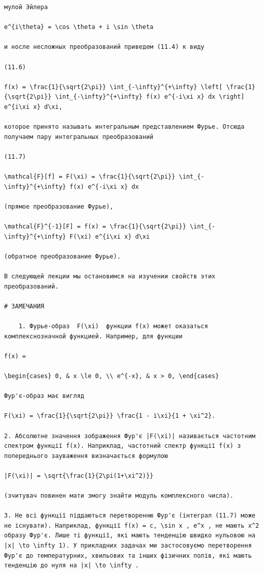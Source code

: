 \documentclass[
  ukrainian,
]{article}
\begin{document}
\begin{verbatim}
мулой Эйлера

e^{i\theta} = \cos \theta + i \sin \theta

и носле несложных преобразований приведем (11.4) к виду

(11.6)

f(x) = \frac{1}{\sqrt{2\pi}} \int_{-\infty}^{+\infty} \left[ \frac{1}{\sqrt{2\pi}} \int_{-\infty}^{+\infty} f(x) e^{-i\xi x} dx \right] e^{i\xi x} d\xi,

которое принято называть интегральным представлением Фурье. Отсюда получаем пару интегральных преобразований

(11.7)

\mathcal{F}[f] = F(\xi) = \frac{1}{\sqrt{2\pi}} \int_{-\infty}^{+\infty} f(x) e^{-i\xi x} dx

(прямое преобразование Фурье),

\mathcal{F}^{-1}[F] = f(x) = \frac{1}{\sqrt{2\pi}} \int_{-\infty}^{+\infty} F(\xi) e^{i\xi x} d\xi

(обратное преобразование Фурье).

В следующей лекции мы остановимся на изучении свойств этих преобразований.

# ЗАМЕЧАНИЯ

    1. Фурье-образ  F(\xi)  функции f(x) может оказаться комплекснозначной функцией. Например, для функции

f(x) =

\begin{cases} 0, & x \le 0, \\ e^{-x}, & x > 0, \end{cases}

Фур'є-образ має вигляд

F(\xi) = \frac{1}{\sqrt{2\pi}} \frac{1 - i\xi}{1 + \xi^2}.

2. Абсолютне значення зображення Фур'є |F(\xi)| називається частотним спектром функції f(x). Наприклад, частотний спектр функції f(x) з попереднього зауваження визначається формулою

|F(\xi)| = \sqrt{\frac{1}{2\pi(1+\xi^2)}}

(зчитувач повинен мати змогу знайти модуль комплексного числа).

3. Не всі функції піддаються перетворенню Фур'є (інтеграл (11.7) може не існувати). Наприклад, функції f(x) = c, \sin x , e^x , не мають x^2 образу Фур'є. Лише ті функції, які мають тенденцію швидко нульовою на |x| \to \infty 1). У прикладних задачах ми застосовуємо перетворення Фур'є до температурних, хвильових та інших фізичних полів, які мають тенденцію до нуля на |x| \to \infty .


\end{verbatim}
\end{document}
